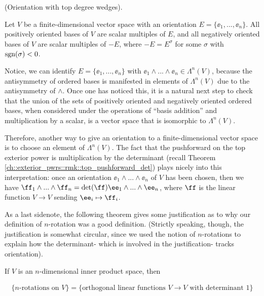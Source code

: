 \begin{theorem}
\label{ch::exterior_pwrs::defn::orientation_with_top_degree_wedges}

    (Orientation with top degree wedges).
    
    Let $V$ be a finite-dimensional vector space with an orientation $E = \{\ee_1, ..., \ee_n\}$. All positively oriented bases of $V$ are scalar multiples of $E$, and all negatively oriented bases of $V$ are scalar multiples of $-E$, where $-E = E^\sigma$ for some $\sigma$ with $\text{sgn}(\sigma) < 0$.
    
    Notice, we can identify $E = \{\ee_1, ..., \ee_n\}$ with $\ee_1 \wedge ... \wedge \ee_n \in \Lambda^n(V)$, because the antisymmetry of ordered bases is manifested in elements of $\Lambda^n(V)$ due to the antisymmetry of $\wedge$. Once one has noticed this, it is a natural next step to check that the union of the sets of positively oriented and negatively oriented ordered bases, when considered under the operations of ``basis addition'' and multiplication by a scalar, is a vector space that is isomorphic to $\Lambda^n(V)$.
    
    Therefore, another way to give an orientation to a finite-dimensional vector space is to choose an element of $\Lambda^n(V)$. The fact that the pushforward on the top exterior power is multiplication by the determinant (recall Theorem \ref{ch::exterior_pwrs::rmk::top_pushforward_det}) plays nicely into this interpretation: once an orientation $\ee_1 \wedge ... \wedge \ee_n$ of $V$ has been chosen, then we have $\ff_1 \wedge ... \wedge \ff_n = \det(\ff) \ee_1 \wedge ... \wedge \ee_n$, where $\ff$ is the linear function $V \rightarrow V$ sending $\ee_i \mapsto \ff_i$.
\end{theorem}

As a last sidenote, the following theorem gives some justification as to why our definition of $n$-rotation was a good definition. (Strictly speaking, though, the justification is somewhat circular, since we used the notion of $n$-rotations to explain how the determinant- which is involved in the justification- tracks orientation).

\begin{theorem}
    If $V$ is an $n$-dimensional inner product space, then 
    
    \begin{align*}
        \{\text{$n$-rotations on $V$}\} = \{\text{orthogonal linear functions $V \rightarrow V$ with determinant 1}\}
    \end{align*}
\end{theorem}

